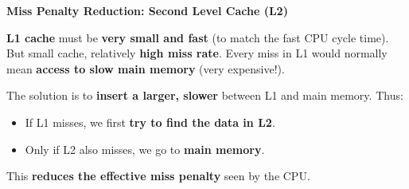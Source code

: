 \newpage
\begin{flushleft}
    \textcolor{Green3}{ \textbf{Miss Penalty Reduction: Second Level Cache (L2)}}
\end{flushleft}
\textbf{L1 cache} must be \textbf{very small and fast} (to match the fast CPU cycle time). But small cache, relatively \textbf{high miss rate}. Every miss in L1 would normally mean \textbf{access to slow main memory} (very expensive!).

\highspace
The solution is to \textbf{insert a larger, slower}  between L1 and main memory. Thus:
\begin{itemize}
    \item If L1 misses, we first \textbf{try to find the data in L2}.
    \item Only if L2 also misses, we go to \textbf{main memory}.
\end{itemize}
This \textbf{reduces the effective miss penalty} seen by the CPU.

\begin{figure}[!htp]
    \centering
\end{figure}

